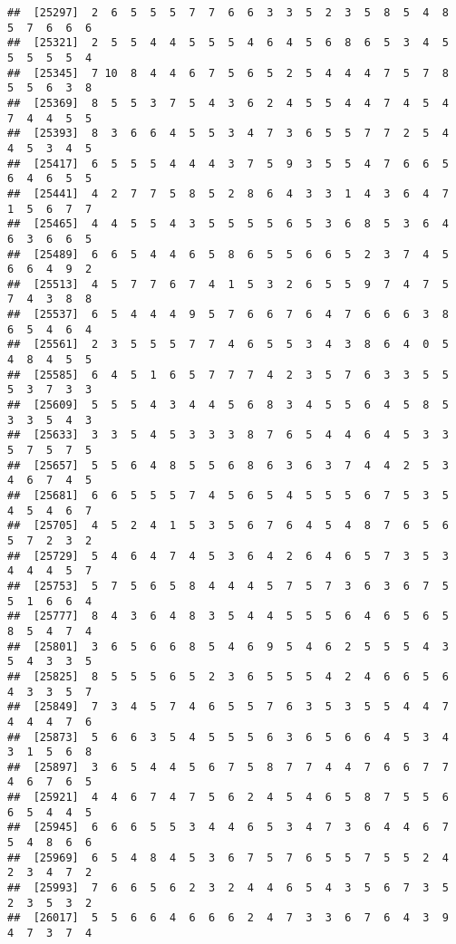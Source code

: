 \documentclass[
]{book}
\begin{document}
\begin{verbatim}
##  [25297]  2  6  5  5  5  7  7  6  6  3  3  5  2  3  5  8  5  4  8  5  7  6  6  6
##  [25321]  2  5  5  4  4  5  5  5  4  6  4  5  6  8  6  5  3  4  5  5  5  5  5  4
##  [25345]  7 10  8  4  4  6  7  5  6  5  2  5  4  4  4  7  5  7  8  5  5  6  3  8
##  [25369]  8  5  5  3  7  5  4  3  6  2  4  5  5  4  4  7  4  5  4  7  4  4  5  5
##  [25393]  8  3  6  6  4  5  5  3  4  7  3  6  5  5  7  7  2  5  4  4  5  3  4  5
##  [25417]  6  5  5  5  4  4  4  3  7  5  9  3  5  5  4  7  6  6  5  6  4  6  5  5
##  [25441]  4  2  7  7  5  8  5  2  8  6  4  3  3  1  4  3  6  4  7  1  5  6  7  7
##  [25465]  4  4  5  5  4  3  5  5  5  5  6  5  3  6  8  5  3  6  4  6  3  6  6  5
##  [25489]  6  6  5  4  4  6  5  8  6  5  5  6  6  5  2  3  7  4  5  6  6  4  9  2
##  [25513]  4  5  7  7  6  7  4  1  5  3  2  6  5  5  9  7  4  7  5  7  4  3  8  8
##  [25537]  6  5  4  4  4  9  5  7  6  6  7  6  4  7  6  6  6  3  8  6  5  4  6  4
##  [25561]  2  3  5  5  5  7  7  4  6  5  5  3  4  3  8  6  4  0  5  4  8  4  5  5
##  [25585]  6  4  5  1  6  5  7  7  7  4  2  3  5  7  6  3  3  5  5  5  3  7  3  3
##  [25609]  5  5  5  4  3  4  4  5  6  8  3  4  5  5  6  4  5  8  5  3  3  5  4  3
##  [25633]  3  3  5  4  5  3  3  3  8  7  6  5  4  4  6  4  5  3  3  5  7  5  7  5
##  [25657]  5  5  6  4  8  5  5  6  8  6  3  6  3  7  4  4  2  5  3  4  6  7  4  5
##  [25681]  6  6  5  5  5  7  4  5  6  5  4  5  5  5  6  7  5  3  5  4  5  4  6  7
##  [25705]  4  5  2  4  1  5  3  5  6  7  6  4  5  4  8  7  6  5  6  5  7  2  3  2
##  [25729]  5  4  6  4  7  4  5  3  6  4  2  6  4  6  5  7  3  5  3  4  4  4  5  7
##  [25753]  5  7  5  6  5  8  4  4  4  5  7  5  7  3  6  3  6  7  5  5  1  6  6  4
##  [25777]  8  4  3  6  4  8  3  5  4  4  5  5  5  6  4  6  5  6  5  8  5  4  7  4
##  [25801]  3  6  5  6  6  8  5  4  6  9  5  4  6  2  5  5  5  4  3  5  4  3  3  5
##  [25825]  8  5  5  5  6  5  2  3  6  5  5  5  4  2  4  6  6  5  6  4  3  3  5  7
##  [25849]  7  3  4  5  7  4  6  5  5  7  6  3  5  3  5  5  4  4  7  4  4  4  7  6
##  [25873]  5  6  6  3  5  4  5  5  5  6  3  6  5  6  6  4  5  3  4  3  1  5  6  8
##  [25897]  3  6  5  4  4  5  6  7  5  8  7  7  4  4  7  6  6  7  7  4  6  7  6  5
##  [25921]  4  4  6  7  4  7  5  6  2  4  5  4  6  5  8  7  5  5  6  6  5  4  4  5
##  [25945]  6  6  6  5  5  3  4  4  6  5  3  4  7  3  6  4  4  6  7  5  4  8  6  6
##  [25969]  6  5  4  8  4  5  3  6  7  5  7  6  5  5  7  5  5  2  4  2  3  4  7  2
##  [25993]  7  6  6  5  6  2  3  2  4  4  6  5  4  3  5  6  7  3  5  2  3  5  3  2
##  [26017]  5  5  6  6  4  6  6  6  2  4  7  3  3  6  7  6  4  3  9  4  7  3  7  4

\end{verbatim}
\end{document}
